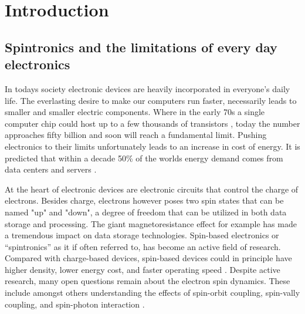 \chapter{Introduction}\label{ch:introduction}
\section{Spintronics and the limitations of every day electronics}
In todays society electronic devices are heavily incorporated in everyone's daily life. The everlasting desire to make our computers run faster, necessarily leads to smaller and smaller electric components. Where in the early 70s a single computer chip could host up to a few thousands of transistors \cite{?}, today the number approaches fifty billion \cite{?} and soon will reach a fundamental limit. Pushing electronics to their limits unfortunately leads to an increase in cost of energy. It is predicted that within a decade 50\% of the worlds energy demand comes from data centers and servers \cite{?}.

At the heart of electronic devices are electronic circuits that control the charge of electrons. Besides charge, electrons however poses two spin states that can be named "up" and "down", a degree of freedom that can be utilized in both data storage and processing. The giant magnetoresistance effect \cite{?} for example has made a tremendous impact on data storage technologies. Spin-based electronics or ``spintronics'' as it if often referred to, has become an active field of research. Compared with charge-based devices, spin-based devices could in principle have higher density, lower energy cost, and faster operating speed \cite{pu_chapter_2020, liu_chapter_2020, book_recent_advancements}. Despite active research, many open questions remain about the electron spin dynamics. These include amongst others understanding the effects of spin-orbit coupling, spin-vally coupling, and spin-photon interaction \cite{liu_chapter_2020}. 





